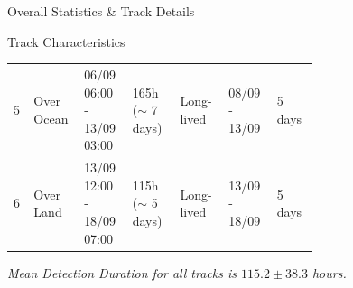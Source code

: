 \documentclass[8pt, aspectratio=169]{beamer}
\begin{document}
\begin{frame}{Overall Statistics \& Track Details}
\begin{center}
\begin{block}{Track Characteristics}
\begin{tabular}{p{0.033\linewidth} p{0.085\linewidth} p{0.106\linewidth} p{0.135\linewidth} p{0.108\linewidth} p{0.107\linewidth} p{0.100\linewidth}}
                5                 & Over Ocean                                             & 06/09 06:00 - 13/09 03:00                            & 165h ($\sim$ 7 days)       & Long-lived                                                    & 08/09 - 13/09                     & 5 days                         \\
                6                 & Over Land                                              & 13/09 12:00 - 18/09 07:00                            & 115h ($\sim$ 5 days)       & Long-lived                                                    & 13/09 - 18/09                     & 5 days                         \\
                \bottomrule
            \end{tabular}
        \end{block}
        \tiny \textit{Mean Detection Duration for all tracks is $115.2 \pm 38.3$ hours.}
    \end{center}

    \vspace{-0.6cm}
\end{frame}

%
\end{document}
